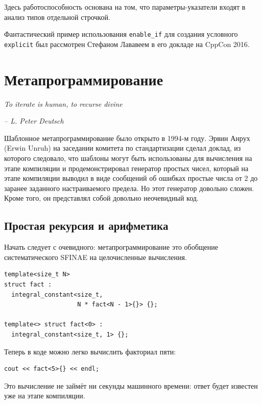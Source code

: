 \documentclass[a4paper,12pt,oneside]{book}
\begin{document}
Здесь работоспособность основана на том, что параметры-указатели входят в анализ типов отдельной строчкой.

Фантастический пример использования \lstinline!enable_if! для создания условного \lstinline!explicit! был рассмотрен Стефаном Лававеем в его докладе на CppCon 2016.

\pagebreak
\section{Метапрограммирование}

\hfill\textit{To iterate is human, to recurse divine}{\vspace{0.5em}}

\hfill\textit{-- L. Peter Deutsch}

Шаблонное метапрограммирование было открыто в 1994-м году. Эрвин Анрух (Erwin Unruh) на заседании комитета по стандартизации сделал доклад, из которого следовало, что шаблоны могут быть использованы для вычисления на этапе компиляции и продемонстрировал генератор простых чисел, который на этапе компиляции выводил в виде сообщений об ошибках простые числа от 2 до заранее заданного настраиваемого предела. Но этот генератор довольно сложен. Кроме того, он представлял собой довольно неочевидный код.

\subsection{Простая рекурсия и арифметика}\label{SimpleRecursion}

Начать следует с очевидного: метапрограммирование это обобщение систематического SFINAE на целочисленные вычисления.

\begin{lstlisting}
template<size_t N>
struct fact : 
  integral_constant<size_t, 
                    N * fact<N - 1>{}> {}; 

template<> struct fact<0> : 
  integral_constant<size_t, 1> {};
\end{lstlisting}

Теперь в коде можно легко вычислить факториал пяти:

\begin{lstlisting}
cout << fact<5>{} << endl;
\end{lstlisting}

Это вычисление не займёт ни секунды машинного времени: ответ будет известен уже на этапе компиляции.
\end{document}
